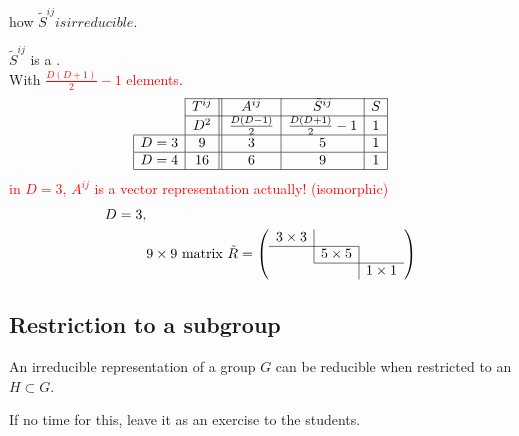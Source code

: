 \documentclass[11pt,fleqn]{book} %
\begin{document}
\begin{itemize}
  \begin{exercise}
    how \(\tilde{S}^{ij} is irreducible.\)
  \end{exercise}
  \(\tilde{S}^{ij}\) is a . \\
  With \textcolor{red}{\(\frac{D(D+1)}{2} - 1\) elements}. \\
  \begin{align*}
    \begin{array}{|c|c||c|c|c|}
      \cline{2-5}
      \multicolumn{1}{l|}{} & T^{ij} & A^{ij} & \tilde{S}^{ij} & S \\ \cline{2-5}
      \multicolumn{1}{l|}{} & D^2 & \frac{D(D-1)}{2} & \frac{D(D+1)}{2} - 1 & 1 \\ \hline
      D=3 & 9 & 3 & 5 & 1 \\ \hline
      D=4& 16 & 6 & 9 & 1 \\ \hline
    \end{array}
  \end{align*}
  \textcolor{red}{in \(D = 3\), \(A^{ij}\) is a vector representation actually! (isomorphic)}
  \begin{align*}
    D = 3,& \\
    & 9 \times 9 \ \text{matrix}\ \tilde{R} = \left( \begin{array}{*{3}{c}}
                                 \multicolumn{1}{l|}{3 \times 3} & &  \\ \cline{1-2}
                                                                 & \multicolumn{1}{|l|}{5 \times 5} &   \\ \cline{2-3}
                                                                 & &\multicolumn{1}{|l}{1 \times 1} \\
                               \end{array} \right)
  \end{align*}
\end{itemize}

\subsection{Restriction to a subgroup}
An irreducible representation of a group \(G\) can be reducible when restricted
to an \(H \subset G\).
\begin{exercise}
  If no time for this, leave it as an exercise to the students.
\end{exercise}

\end{document}
